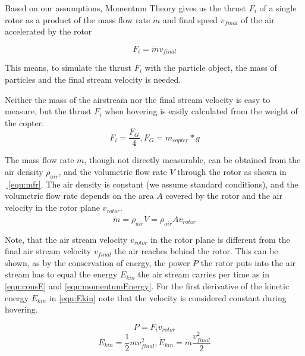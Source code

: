     Based on our assumptions, Momentum Theory gives us the thrust $F_i$ of a single rotor as a product  of the mass flow rate $\dot m$ and final speed $v_{final}$ of the air accelerated by the rotor  
    
    \begin{equation}
    F_i = \dot m v_{final} 
    \label{equ:momentum}
    \end{equation}
    
    This means, to simulate the thrust $F_i$ with the particle object, the mass of particles and the final stream velocity is needed.
    
    Neither the mass of the airstream nor the final stream velocity is easy to measure, but the thrust $F_i$ when hovering is easily calculated from the weight of the copter.
    \begin{equation}
    F_i = \frac{F_G} {4}, F_G = m_{copter} * g
    \end{equation}
    
    
    The mass flow rate $\dot m$, though not directly measurable,  can be obtained from the air density $\rho_{air}$, and the volumetric flow rate $\dot V$ through the rotor as shown in ¸\ref{equ:mfr}. 
    The air density is constant (we assume standard conditions), and the volumetric flow rate  depends on the area $A$ covered by the rotor and the air velocity in the rotor plane $v_{rotor}$.
    \begin{equation}
    \dot m = \rho_{air} \dot V = \rho_{air} A v_{rotor}
    \label{equ:mfr}
    \end{equation}
    
    Note, that the air stream velocity $v_{rotor}$ in the rotor plane is different from the final air stream velocity $v_{final}$ the air reaches behind the rotor. 
    This can be shown, as by the conservation of energy, the power $P$ the rotor puts into the air stream has to equal the energy $E_{kin}$ the air stream carries per time as in \ref{equ:consE} and \ref{equ:momentumEnergy}. 
    For the first derivative of the kinetic energy $E_{kin}$ in \ref{equ:Ekin} note that the velocity is considered constant during hovering.
    
    \begin{equation}
    P = F_i v_{rotor}
    \end{equation}
    \begin{equation}
    E_{kin} = \frac{1}{2} m v_{final}^2, \dot E_{kin} = \dot m \frac{v_{final}^2}{2}
    \label{equ:Ekin}
    \end{equation}
    
